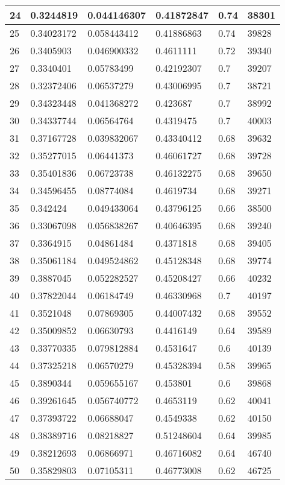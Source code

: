\begin{longtable}{|l|l|l|l|l|l|}
24 & 0.3244819 & 0.044146307 & 0.41872847 & 0.74 & 38301 \\ \hline 
25 & 0.34023172 & 0.058443412 & 0.41886863 & 0.74 & 39828 \\ \hline 
26 & 0.3405903 & 0.046900332 & 0.4611111 & 0.72 & 39340 \\ \hline 
27 & 0.3340401 & 0.05783499 & 0.42192307 & 0.7 & 39207 \\ \hline 
28 & 0.32372406 & 0.06537279 & 0.43006995 & 0.7 & 38721 \\ \hline 
29 & 0.34323448 & 0.041368272 & 0.423687 & 0.7 & 38992 \\ \hline 
30 & 0.34337744 & 0.06564764 & 0.4319475 & 0.7 & 40003 \\ \hline 
31 & 0.37167728 & 0.039832067 & 0.43340412 & 0.68 & 39632 \\ \hline 
32 & 0.35277015 & 0.06441373 & 0.46061727 & 0.68 & 39728 \\ \hline 
33 & 0.35401836 & 0.06723738 & 0.46132275 & 0.68 & 39650 \\ \hline 
34 & 0.34596455 & 0.08774084 & 0.4619734 & 0.68 & 39271 \\ \hline 
35 & 0.342424 & 0.049433064 & 0.43796125 & 0.66 & 38500 \\ \hline 
36 & 0.33067098 & 0.056838267 & 0.40646395 & 0.68 & 39240 \\ \hline 
37 & 0.3364915 & 0.04861484 & 0.4371818 & 0.68 & 39405 \\ \hline 
38 & 0.35061184 & 0.049524862 & 0.45128348 & 0.68 & 39774 \\ \hline 
39 & 0.3887045 & 0.052282527 & 0.45208427 & 0.66 & 40232 \\ \hline 
40 & 0.37822044 & 0.06184749 & 0.46330968 & 0.7 & 40197 \\ \hline 
41 & 0.3521048 & 0.07869305 & 0.44007432 & 0.68 & 39552 \\ \hline 
42 & 0.35009852 & 0.06630793 & 0.4416149 & 0.64 & 39589 \\ \hline 
43 & 0.33770335 & 0.079812884 & 0.4531647 & 0.6 & 40139 \\ \hline 
44 & 0.37325218 & 0.06570279 & 0.45328394 & 0.58 & 39965 \\ \hline 
45 & 0.3890344 & 0.059655167 & 0.453801 & 0.6 & 39868 \\ \hline 
46 & 0.39261645 & 0.056740772 & 0.4653119 & 0.62 & 40041 \\ \hline 
47 & 0.37393722 & 0.06688047 & 0.4549338 & 0.62 & 40150 \\ \hline 
48 & 0.38389716 & 0.08218827 & 0.51248604 & 0.64 & 39985 \\ \hline 
49 & 0.38212693 & 0.06866971 & 0.46716082 & 0.64 & 46740 \\ \hline 
50 & 0.35829803 & 0.07105311 & 0.46773008 & 0.62 & 46725 \\ \hline 
\end{longtable}